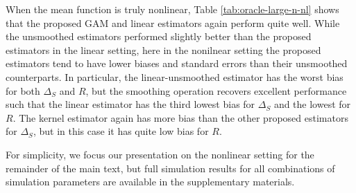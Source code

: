 \documentclass[useAMS,usenatbib,referee]{biom}
\begin{document}
When the  mean function is truly nonlinear, Table \ref{tab:oracle-large-n-nl} shows that the proposed GAM and linear estimators again perform quite well. While the unsmoothed estimators performed slightly better than the proposed estimators in the linear setting, here in the nonilnear setting the proposed estimators tend to have lower biases and standard errors than their unsmoothed counterparts. In particular, the linear-unsmoothed estimator has the worst bias for both $\Delta_S$ and $R$, but the smoothing operation recovers excellent performance such that the linear estimator has the third lowest bias for $\Delta_S$ and the lowest for $R$. The kernel estimator again has more bias than the other proposed estimators for $\Delta_S$, but in this case it has quite low bias for $R$. 

For simplicity, we focus our presentation on the nonlinear setting for the remainder of the main text, but full simulation results for all combinations of simulation parameters are available in the supplementary materials. 
\end{document}
